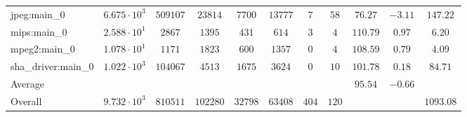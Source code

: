 \begin{tabular}{|l|c|c|c|c|c|c|c|c|c|c|}
jpeg:main\_0            & $ 6.675 \cdot 10^{3} $ & $ 509107 $ & $ 23814  $ & $ 7700  $ & $ 13777 $ & $ 7   $ & $ 58  $ & $ 76.27       $ & $ -3.11   $ & $ 147.22  $ \\
mips:main\_0            & $ 2.588 \cdot 10^{1} $ & $ 2867   $ & $ 1395   $ & $ 431   $ & $ 614   $ & $ 3   $ & $ 4   $ & $ 110.79      $ & $ 0.97    $ & $ 6.20    $ \\
mpeg2:main\_0           & $ 1.078 \cdot 10^{1} $ & $ 1171   $ & $ 1823   $ & $ 600   $ & $ 1357  $ & $ 0   $ & $ 4   $ & $ 108.59      $ & $ 0.79    $ & $ 4.09    $ \\
sha\_driver:main\_0     & $ 1.022 \cdot 10^{3} $ & $ 104067 $ & $ 4513   $ & $ 1675  $ & $ 3624  $ & $ 0   $ & $ 10  $ & $ 101.78      $ & $ 0.18    $ & $ 84.71   $ \\
\hline
Average                 & $                    $ & $        $ & $        $ & $       $ & $       $ & $     $ & $     $ & $ 95.54       $ & $ -0.66   $ & $         $ \\
\hline
Overall                 & $ 9.732 \cdot 10^{3} $ & $ 810511 $ & $ 102280 $ & $ 32798 $ & $ 63408 $ & $ 404 $ & $ 120 $ & $             $ & $         $ & $ 1093.08 $ \\
\hline
\end{tabular}
